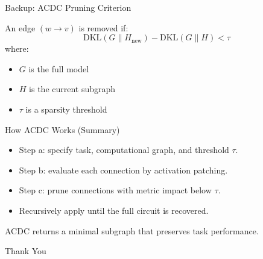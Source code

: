 \documentclass{beamer}
\begin{document}
	
	\begin{frame}{Backup: ACDC Pruning Criterion}
		\small
		
		An edge $(w \rightarrow v)$ is removed if:
		\[
		\mathrm{DKL}(G \parallel H_{\text{new}}) - 
		\mathrm{DKL}(G \parallel H) < \tau
		\]
		where:
		\begin{itemize}
			\item $G$ is the full model
			\item $H$ is the current subgraph
			\item $\tau$ is a sparsity threshold
		\end{itemize}
	\end{frame}
	
	
	
	\begin{frame}{How ACDC Works (Summary)}
		\begin{itemize}
			\item Step a: specify task, computational graph, and threshold $\tau$.
			\item Step b: evaluate each connection by activation patching.
			\item Step c: prune connections with metric impact below $\tau$.
			\item Recursively apply until the full circuit is recovered.
		\end{itemize}
		
		\vspace{4pt}
		\scriptsize
		\centering
		ACDC returns a minimal subgraph that preserves task performance.
	\end{frame}
	
	\begin{frame}
		\centering
		\Large Thank You
	\end{frame}
	
\end{document}
